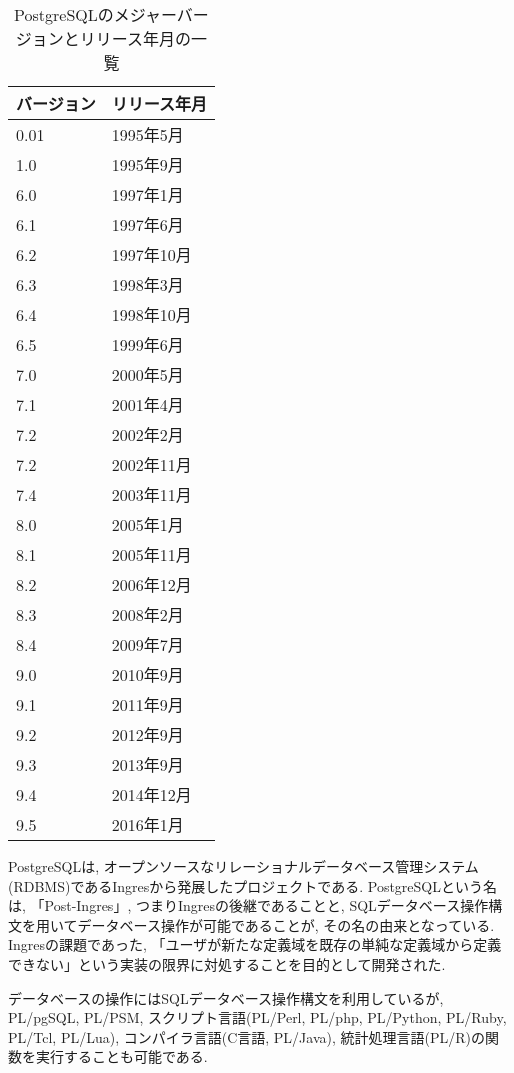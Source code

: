 \begin{table}[htb]
\begin{center}
\begin{tabular}{|l|l|} \hline
バージョン & リリース年月 \\ \hline \hline
0.01 & 1995年5月 \\ \hline
1.0 & 1995年9月 \\ \hline
6.0 & 1997年1月 \\ \hline
6.1 & 1997年6月 \\ \hline
6.2 & 1997年10月 \\ \hline
6.3 & 1998年3月 \\ \hline
6.4 & 1998年10月 \\ \hline
6.5 & 1999年6月 \\ \hline
7.0 & 2000年5月 \\ \hline
7.1 & 2001年4月 \\ \hline
7.2 & 2002年2月 \\ \hline
7.2 & 2002年11月 \\ \hline
7.4 & 2003年11月 \\ \hline
8.0 & 2005年1月 \\ \hline
8.1 & 2005年11月 \\ \hline
8.2 & 2006年12月 \\ \hline
8.3 & 2008年2月 \\ \hline
8.4 & 2009年7月 \\ \hline
9.0 & 2010年9月 \\ \hline
9.1 & 2011年9月 \\ \hline
9.2 & 2012年9月 \\ \hline
9.3 & 2013年9月 \\ \hline
9.4 & 2014年12月 \\ \hline
9.5 & 2016年1月 \\ \hline
\end{tabular}
\caption{PostgreSQLのメジャーバージョンとリリース年月の一覧}
\end{center}
\end{table}

PostgreSQLは, オープンソースなリレーショナルデータベース管理システム(RDBMS)であるIngresから発展したプロジェクトである.
PostgreSQLという名は, 「Post-Ingres」, つまりIngresの後継であることと, SQLデータベース操作構文を用いてデータベース操作が可能であることが, その名の由来となっている.
Ingresの課題であった, 「ユーザが新たな定義域を既存の単純な定義域から定義できない」という実装の限界に対処することを目的として開発された.

データベースの操作にはSQLデータベース操作構文を利用しているが, PL/pgSQL, PL/PSM, スクリプト言語(PL/Perl, PL/php, PL/Python, PL/Ruby, PL/Tcl, PL/Lua), コンパイラ言語(C言語, PL/Java), 統計処理言語(PL/R)の関数を実行することも可能である.


